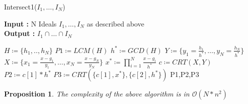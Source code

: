 \documentclass{article}
\newtheorem{proposition}{Proposition}[section]
\begin{document}
\begin{algorithm}[H]
    \caption{Intersect1($I_{1},\dots,I_{N}$)}\label{alg:intersect-n-ideals-equal-gcd}
    \textbf{Input : } N Ideals $I_{1},\dots,I_{N}$ as described above \\
    \textbf{Output : }$I_{1} \cap \dots\cap I_ {N}$
\begin{algorithmic}
    \State $H \coloneqq \{h_{1},..,h_{N}\}$
    \State $P1 \coloneqq LCM(H)$
    \State $h^{*} \coloneqq GCD(H)$
    \State $Y\coloneqq \{y_{1}= \frac{h_{1}}{h^{*}},\dots,y_{N}= \frac{h_{N}}{h^{*}}\}$
    \State $X \coloneqq \{x_{1} = \frac{x-g_{1}}{y_{1}},\dots,x_{N} =\frac{x-g_{N}}{y_{N}}\}$
    \State $x^{*} \coloneqq \prod^{N}_{i=1} \frac{x-g_{i}}{h^{*}}$
    \State $c\coloneqq CRT(X,Y)$
    \State $P2 \coloneqq c[1]*h^{*}$ 
    \State $P3 \coloneqq CRT(\{c[1],x^{*}\},\{c[2], h^{*}\})$
    \State \Return P1,P2,P3
\end{algorithmic}
\end{algorithm}

\begin{proposition} 
    The complexity of the above algorithm is in $\mathcal{O}(N*n^2)$
\end{proposition}
\end{document}

